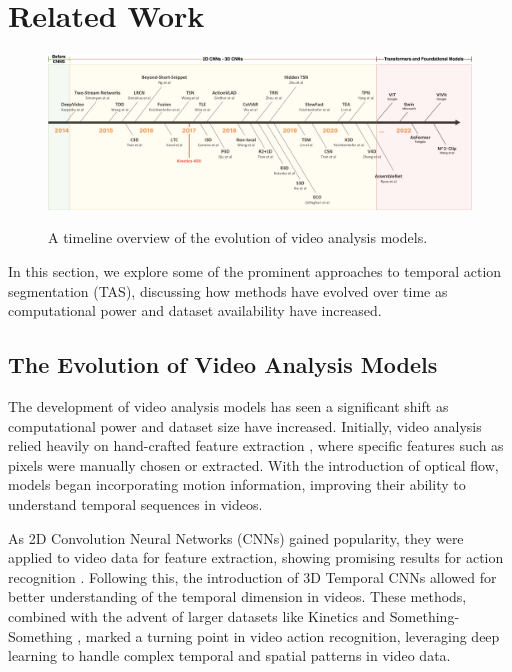 \section{Related Work}

\begin{figure}[t]
    \centering
    \includegraphics[width=\textwidth]{../../assets/figures/extended-video-timeline-v3.png}
    \caption{A timeline overview of the evolution of video analysis models.}
    \label{figure:video-models-evolution}
    \cite{video-action-recognition-study}
\end{figure}

In this section, we explore some of the prominent approaches to temporal action segmentation (TAS), discussing how methods have evolved over time as computational power and dataset availability have increased.

\subsection{The Evolution of Video Analysis Models}

The development of video analysis models has seen a significant shift as computational power and dataset size have increased. Initially, video analysis relied heavily on hand-crafted feature extraction \cite{handcrafted-features-1,handcrafted-features-2}, where specific features such as pixels were manually chosen or extracted. With the introduction of optical flow\cite{i3d}, models began incorporating motion information, improving their ability to understand temporal sequences in videos.

As 2D Convolution Neural Networks (CNNs) gained popularity, they were applied to video data for feature extraction, showing promising results for action recognition \cite{tsn}. Following this, the introduction of 3D Temporal CNNs \cite{s3d,r3d,x3d,i3d,slowfast} allowed for better understanding of the temporal dimension in videos. These methods, combined with the advent of larger datasets like Kinetics \cite{kinetics-400-dataset} and Something-Something \cite{something-something-dataset}, marked a turning point in video action recognition, leveraging deep learning to handle complex temporal and spatial patterns in video data.


